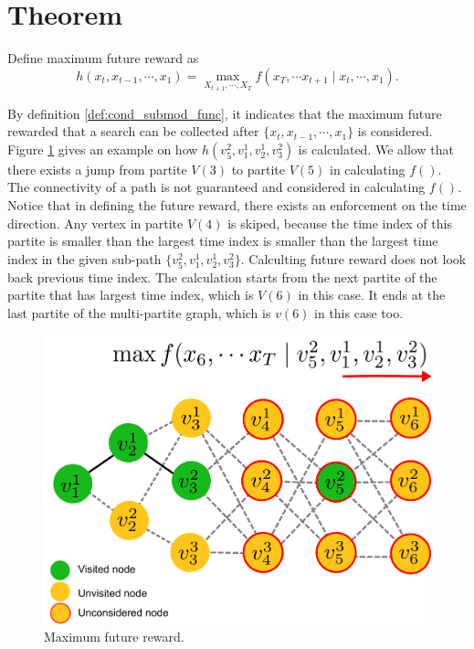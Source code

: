 \documentclass[12pt]{article}
\begin{document}
\section{Theorem}

\begin{mydef}
\label{def:max_future_reward}
Define maximum future reward as
\begin{equation}
\label{eq:def_h}
h(x_{t} , x_{t-1} , \cdots, x_{1} ) = \max_{X_{t+1}, \cdots , X_{T}} f(x_{T}, \cdots x_{t+1} \mid x_{t}, \cdots , x_{1}).
\end{equation} 
\end{mydef}

By definition \ref{def:cond_submod_func}, it indicates that the maximum future rewarded that a search can be collected after $ \{  x_{t} , x_{t-1} , \cdots, x_{1} \}  $ is considered.
Figure \ref{fig:DefineFuncH} gives an example on how $ h(v^{2}_{5}, v^{1}_{1}, v^{1}_{2}, v^{2}_{3}) $ is calculated.
We allow that there exists a jump from partite $ V(3) $ to partite $ V(5) $ in calculating $ f() $.
The connectivity of a path is not guaranteed and considered in calculating $ f() $.
Notice that in defining the future reward, there exists an enforcement on the time direction.
Any vertex in partite $ V(4) $ is skiped, because the time index of this partite is smaller than the largest time index is smaller than the largest time index in the given sub-path $ \{ v^{2}_{5}, v^{1}_{1}, v^{1}_{2}, v^{2}_{3}  \} $.
Calculting future reward does not look back previous time index.
The calculation starts from the next partite of the partite that has largest time index, which is $ V(6) $ in this case.
It ends at the last partite of the multi-partite graph, which is $ v(6) $ in this case too.

\begin{figure}
\centering
\includegraphics[width=0.5\linewidth]{./DefineFuncH}
\caption{Maximum future reward.}
\label{fig:DefineFuncH}
\end{figure}
\end{document}

